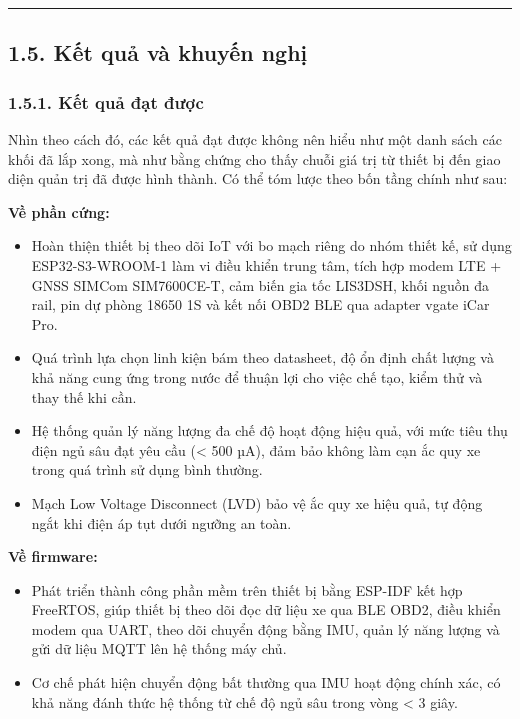 \documentclass[a4paper]{extarticle}
\providecommand{\tightlist}{%
  \setlength{\itemsep}{0pt}\setlength{\parskip}{0pt}}
\begin{document}
\begin{center}\rule{0.5\linewidth}{0.5pt}\end{center}

\subsection{1.5. Kết quả và khuyến
nghị}\label{15-kux1ebft-quux1ea3-vuxe0-khuyux1ebfn-nghux1ecb}

\subsubsection{1.5.1. Kết quả đạt
được}\label{151-kux1ebft-quux1ea3-ux111ux1ea1t-ux111ux1b0ux1ee3c}

Nhìn theo cách đó, các kết quả đạt được không nên hiểu như một danh sách
các khối đã lắp xong, mà như bằng chứng cho thấy chuỗi giá trị từ thiết
bị đến giao diện quản trị đã được hình thành. Có thể tóm lược theo bốn tầng chính
như sau:

\textbf{Về phần cứng:}

\begin{itemize}
\tightlist
\item
  Hoàn thiện thiết bị theo dõi IoT với bo mạch riêng do nhóm thiết kế, sử
  dụng ESP32-S3-WROOM-1 làm vi điều khiển trung tâm, tích hợp modem LTE
  + GNSS SIMCom SIM7600CE-T, cảm biến gia tốc LIS3DSH, khối nguồn đa
  rail, pin dự phòng 18650 1S và kết nối OBD2 BLE qua adapter vgate iCar
  Pro.
\item
  Quá trình lựa chọn linh kiện bám theo datasheet, độ ổn định chất lượng
  và khả năng cung ứng trong nước để thuận lợi cho việc chế tạo, kiểm
  thử và thay thế khi cần.
\item
  Hệ thống quản lý năng lượng đa chế độ hoạt động hiệu quả, với mức tiêu
  thụ điện ngủ sâu đạt yêu cầu (\textless{} 500 µA), đảm bảo không làm
  cạn ắc quy xe trong quá trình sử dụng bình thường.
\item
  Mạch Low Voltage Disconnect (LVD) bảo vệ ắc quy xe hiệu quả, tự động
  ngắt khi điện áp tụt dưới ngưỡng an toàn.
\end{itemize}

\textbf{Về firmware:}

\begin{itemize}
\tightlist
\item
  Phát triển thành công phần mềm trên thiết bị bằng ESP-IDF kết hợp
  FreeRTOS, giúp thiết bị theo dõi đọc dữ liệu xe qua BLE OBD2, điều khiển modem
  qua UART, theo dõi chuyển động bằng IMU, quản lý năng lượng và gửi dữ
  liệu MQTT lên hệ thống máy chủ.
\item
  Cơ chế phát hiện chuyển động bất thường qua IMU hoạt động chính xác,
  có khả năng đánh thức hệ thống từ chế độ ngủ sâu trong vòng
  \textless{} 3 giây.
\end{itemize}
\end{document}

